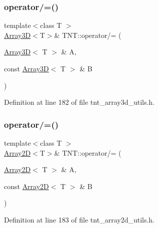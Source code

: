 \subsubsection{\texorpdfstring{operator/=()}{operator/=()}\hspace{0.1cm}{\footnotesize\ttfamily [3/5]}}
{\footnotesize\ttfamily template$<$class T $>$ \\
\hyperlink{classTNT_1_1Array3D}{Array3D}$<$T$>$\& T\+N\+T\+::operator/= (\begin{DoxyParamCaption}\item[{\hyperlink{classTNT_1_1Array3D}{Array3D}$<$ T $>$ \&}]{A,  }\item[{const \hyperlink{classTNT_1_1Array3D}{Array3D}$<$ T $>$ \&}]{B }\end{DoxyParamCaption})}



Definition at line 182 of file tnt\+\_\+array3d\+\_\+utils.\+h.

\mbox{\label{namespaceTNT_a3a7f9891f9ba3972d65fe38e18e94a1a}} 
\subsubsection{\texorpdfstring{operator/=()}{operator/=()}\hspace{0.1cm}{\footnotesize\ttfamily [4/5]}}
{\footnotesize\ttfamily template$<$class T $>$ \\
\hyperlink{classTNT_1_1Array2D}{Array2D}$<$T$>$\& T\+N\+T\+::operator/= (\begin{DoxyParamCaption}\item[{\hyperlink{classTNT_1_1Array2D}{Array2D}$<$ T $>$ \&}]{A,  }\item[{const \hyperlink{classTNT_1_1Array2D}{Array2D}$<$ T $>$ \&}]{B }\end{DoxyParamCaption})}



Definition at line 183 of file tnt\+\_\+array2d\+\_\+utils.\+h.

\mbox{\label{namespaceTNT_ae288b6afc4faaa8b3a6bc1a14c4c42b4}} 
